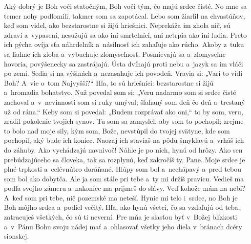 Aký dobrý je Boh voči statočným,
Boh voči tým, čo majú srdce čisté.
\versseparator
No mne sa temer nohy podlomili,
takmer som sa zapotácal.
\versseparator
Lebo som žiarlil na chvastúňov,
keď som videl, ako bezstarostne si žijú hriešnici.
\versseparator
Neprekáža im zhola nič,
sú zdraví a~vypasení,
\versseparator
nesužujú sa ako iní smrteľníci,
ani netrpia ako iní ľudia.
\versseparator
Preto ich pýcha ovíja sťa náhrdelník
a~násilnosť ich zahaľuje ako rúcho.
\versseparator
Akoby z~tuku sa liahne ich zloba
a~vybuchuje zlomyseľnosť.
\versseparator
Posmievajú sa a~zlomyseľne hovoria,
povýšenecky sa zastrájajú.
\versseparator
Ústa dvíhajú proti nebu
a~jazyk sa im vláči po zemi.
\versseparator
Sedia si na výšinách
a~nezasahuje ich povodeň.
\versseparator
Vravia si: „Vari to vidí Boh?
A~vie o~tom Najvyšší?“
\versseparator
Hľa, to sú hriešnici: bezstarostne si žijú
a~hromadia bohatstvo.
\versseparator
Nuž povedal som si: „Veru nadarmo som si srdce čisté zachoval
a~v~nevinnosti som si ruky umýval;
\versseparator
šľahaný som deň čo deň
a~trestaný už od rána.“
\versseparator
Keby som si povedal: „Budem rozprávať ako oni,“
to by som, veru, zradil pokolenie tvojich synov.
\versseparator
Tu som sa zamyslel, aby som to pochopil;
zrejme to bolo nad moje sily,
\versseparator
kým som, Bože, nevstúpil do tvojej svätyne,
kde som pochopil, aký bude ich koniec.
\versseparator
Naozaj ich staviaš na pôdu šmykľavú
a~vrháš ich do záhuby.
\versseparator
Ako vychádzajú navnivoč!
Náhle je po nich, hynú od hrôzy.
\versseparator
Ako sen prebúdzajúceho sa človeka,
tak sa rozplynú, keď zakročíš ty, Pane.
\versseparator
Moje srdce je plné trpkosti
a~celévnútro doráňané.
Hlúpy som bol a~nechápavý
\versseparator
a~pred tebou som bol ako dobytča.
Ale ja som stále pri tebe
\versseparator
a~ty mi držíš pravicu.
Vedieš ma podľa svojho zámeru
a~nakoniec ma prijmeš do slávy.
\versseparator
Veď kohože mám na nebi?
A~keď som pri tebe, nič pozemské ma neteší.
\versseparator
Hynie mi telo i~srdce,
no Boh je Boh môjho srdca a~podiel večitý.
\versseparator
Hľa, ako hynú všetci, čo sa vzďaľujú od teba,
zatracuješ všetkých, čo sú ti neverní.
\versseparator
Pre mňa je slasťou byť v~Božej blízkosti
a~v~Pánu Bohu svoju nádej mať
\versseparator
a~ohlasovať všetky jeho diela
v~bránach dcéry sionskej.